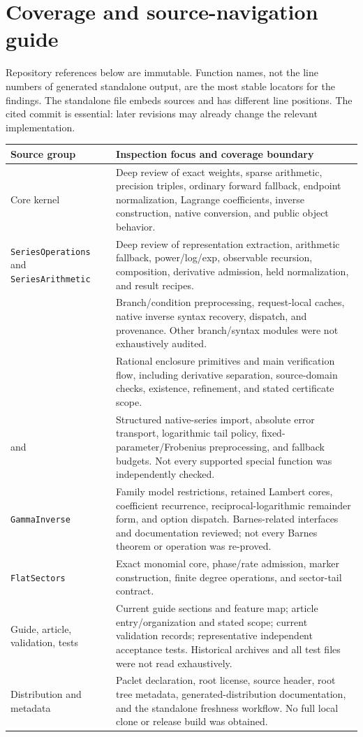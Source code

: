 \section{Coverage and source-navigation guide}
\label{sec:coverage}

Repository references below are immutable. Function names, not the line numbers of generated standalone output, are the most stable locators for the findings. The standalone file embeds sources and has different line positions. The cited commit is essential: later revisions may already change the relevant implementation.

\begin{longtable}{@{}P{5.1cm}P{9.8cm}@{}}
\toprule Source group & Inspection focus and coverage boundary \\\midrule
\endhead
Core kernel & Deep review of exact weights, sparse arithmetic, precision triples, ordinary forward fallback, endpoint normalization, Lagrange coefficients, inverse construction, native conversion, and public object behavior.\\
\texttt{SeriesOperations} and \texttt{SeriesArithmetic} & Deep review of representation extraction, arithmetic fallback, power/log/exp, observable recursion, composition, derivative admission, held normalization, and result recipes.\\
 & Branch/condition preprocessing, request-local caches, native inverse syntax recovery, dispatch, and provenance. Other branch/syntax modules were not exhaustively audited.\\
 & Rational enclosure primitives and main verification flow, including derivative separation, source-domain checks, existence, refinement, and stated certificate scope.\\
 and  & Structured native-series import, absolute error transport, logarithmic tail policy, fixed-parameter/Frobenius preprocessing, and fallback budgets. Not every supported special function was independently checked.\\
\texttt{GammaInverse} & Family model restrictions, retained Lambert cores, coefficient recurrence, reciprocal-logarithmic remainder form, and option dispatch. Barnes-related interfaces and documentation reviewed; not every Barnes theorem or operation was re-proved.\\
\texttt{FlatSectors} & Exact monomial core, phase/rate admission, marker construction, finite degree operations, and sector-tail contract.\\
Guide, article, validation, tests & Current guide sections and feature map; article entry/organization and stated scope; current validation records; representative independent acceptance tests. Historical archives and all test files were not read exhaustively.\\
Distribution and metadata & Paclet declaration, root license, source header, root tree metadata, generated-distribution documentation, and the standalone freshness workflow. No full local clone or release build was obtained.\\
\bottomrule
\end{longtable}

